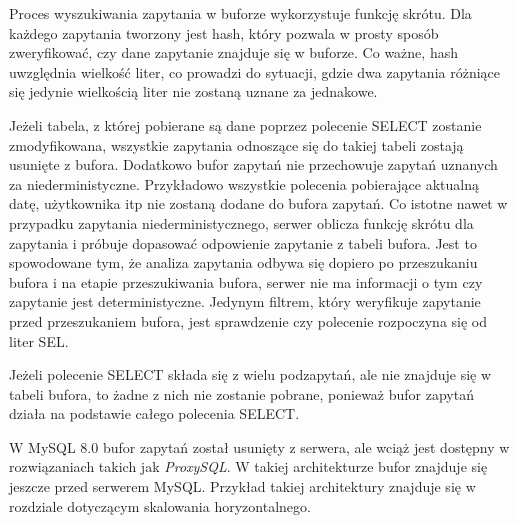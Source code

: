 Proces wyszukiwania zapytania w buforze wykorzystuje funkcję skrótu. Dla każdego zapytania tworzony jest hash, który pozwala w prosty sposób zweryfikować, czy dane zapytanie znajduje się w buforze. Co ważne, hash uwzględnia wielkość liter, co prowadzi do sytuacji, gdzie dwa zapytania różniące się jedynie wielkością liter nie zostaną uznane za jednakowe.

Jeżeli tabela, z której pobierane są dane poprzez polecenie SELECT  zostanie zmodyfikowana, wszystkie zapytania odnoszące się do takiej tabeli zostają usunięte z bufora. Dodatkowo bufor zapytań nie przechowuje zapytań uznanych za niederministyczne. Przykładowo wszystkie polecenia pobierające aktualną datę, użytkownika itp nie zostaną dodane do bufora zapytań. Co istotne nawet w przypadku zapytania niederministycznego, serwer oblicza funkcję skrótu dla zapytania i próbuje dopasować odpowienie zapytanie z tabeli bufora. Jest to spowodowane tym, że analiza zapytania odbywa się dopiero po przeszukaniu bufora i na etapie przeszukiwania bufora, serwer nie ma informacji o tym czy zapytanie jest deterministyczne. Jedynym filtrem, który weryfikuje zapytanie przed przeszukaniem bufora, jest sprawdzenie czy polecenie rozpoczyna się od liter SEL.

Jeżeli polecenie SELECT składa się z wielu podzapytań, ale nie znajduje się w tabeli bufora, to żadne z nich nie zostanie pobrane, ponieważ bufor zapytań działa na podstawie całego polecenia SELECT.

W MySQL 8.0 bufor zapytań został usunięty z serwera, ale wciąż jest dostępny w rozwiązaniach takich jak \textit{ProxySQL}. W takiej architekturze bufor znajduje się jeszcze przed serwerem MySQL. Przykład takiej architektury znajduje się w rozdziale dotyczącym skalowania horyzontalnego.

